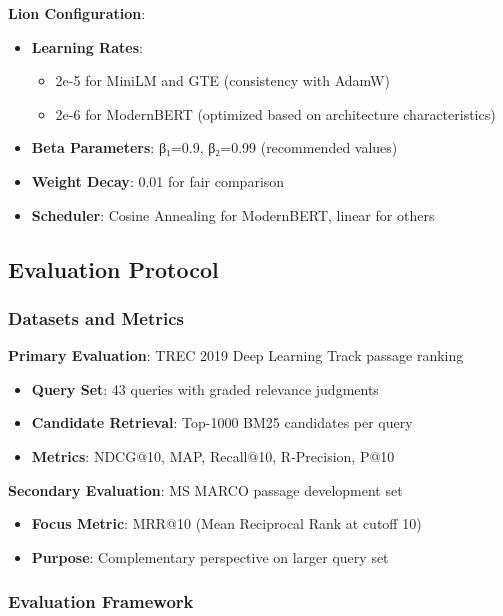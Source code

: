 \textbf{Lion Configuration}:
\begin{itemize}
    \item \textbf{Learning Rates}: 
    \begin{itemize}
        \item 2e-5 for MiniLM and GTE (consistency with AdamW)
        \item 2e-6 for ModernBERT (optimized based on architecture characteristics)
    \end{itemize}
    \item \textbf{Beta Parameters}: β₁=0.9, β₂=0.99 (recommended values)
    \item \textbf{Weight Decay}: 0.01 for fair comparison
    \item \textbf{Scheduler}: Cosine Annealing for ModernBERT, linear for others
\end{itemize}

\subsection{Evaluation Protocol}

\subsubsection{Datasets and Metrics}

\textbf{Primary Evaluation}: TREC 2019 Deep Learning Track passage ranking
\begin{itemize}
    \item \textbf{Query Set}: 43 queries with graded relevance judgments
    \item \textbf{Candidate Retrieval}: Top-1000 BM25 candidates per query
    \item \textbf{Metrics}: NDCG@10, MAP, Recall@10, R-Precision, P@10
\end{itemize}

\textbf{Secondary Evaluation}: MS MARCO passage development set
\begin{itemize}
    \item \textbf{Focus Metric}: MRR@10 (Mean Reciprocal Rank at cutoff 10)
    \item \textbf{Purpose}: Complementary perspective on larger query set
\end{itemize}

\subsubsection{Evaluation Framework}

